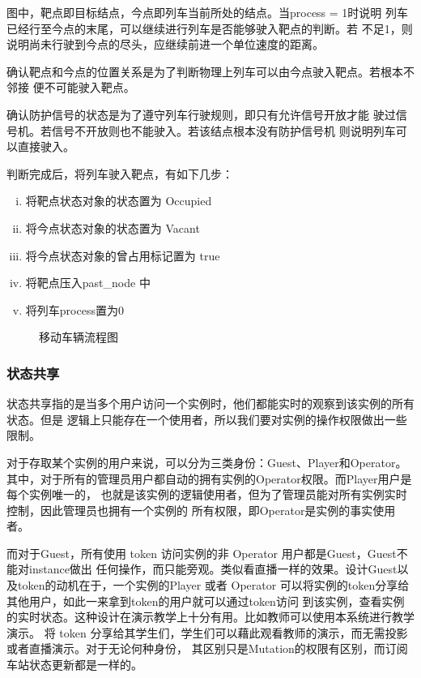 图中，靶点即目标结点，今点即列车当前所处的结点。当process = 1时说明
列车已经行至今点的末尾，可以继续进行列车是否能够驶入靶点的判断。若
不足1，则说明尚未行驶到今点的尽头，应继续前进一个单位速度的距离。

确认靶点和今点的位置关系是为了判断物理上列车可以由今点驶入靶点。若根本不邻接
便不可能驶入靶点。

确认防护信号的状态是为了遵守列车行驶规则，即只有允许信号开放才能
驶过信号机。若信号不开放则也不能驶入。若该结点根本没有防护信号机
则说明列车可以直接驶入。

判断完成后，将列车驶入靶点，有如下几步：

\begin{enumerate}[i.]
    \item 将靶点状态对象的状态置为 Occupied
    \item 将今点状态对象的状态置为 Vacant
    \item 将今点状态对象的曾占用标记置为 true
    \item 将靶点压入past\_node 中
    \item 将列车process置为0
\end{enumerate}

\begin{figure}[htbp!]
    \centering
    
    \caption{\label{tmf}移动车辆流程图}
\end{figure}

\subsubsection{状态共享}
状态共享指的是当多个用户访问一个实例时，他们都能实时的观察到该实例的所有状态。但是
逻辑上只能存在一个使用者，所以我们要对实例的操作权限做出一些限制。

对于存取某个实例的用户来说，可以分为三类身份：Guest、Player和Operator。
其中，对于所有的管理员用户都自动的拥有实例的Operator权限。而Player用户是每个实例唯一的，
也就是该实例的逻辑使用者，但为了管理员能对所有实例实时控制，因此管理员也拥有一个实例的
所有权限，即Operator是实例的事实使用者。

而对于Guest，所有使用 token 访问实例的非 Operator 用户都是Guest，Guest不能对instance做出
任何操作，而只能旁观。类似看直播一样的效果。设计Guest以及token的动机在于，一个实例的Player
或者 Operator 可以将实例的token分享给其他用户，如此一来拿到token的用户就可以通过token访问
到该实例，查看实例的实时状态。这种设计在演示教学上十分有用。比如教师可以使用本系统进行教学演示。
将 token 分享给其学生们，学生们可以藉此观看教师的演示，而无需投影或者直播演示。对于无论何种身份，
其区别只是Mutation的权限有区别，而订阅车站状态更新都是一样的。

